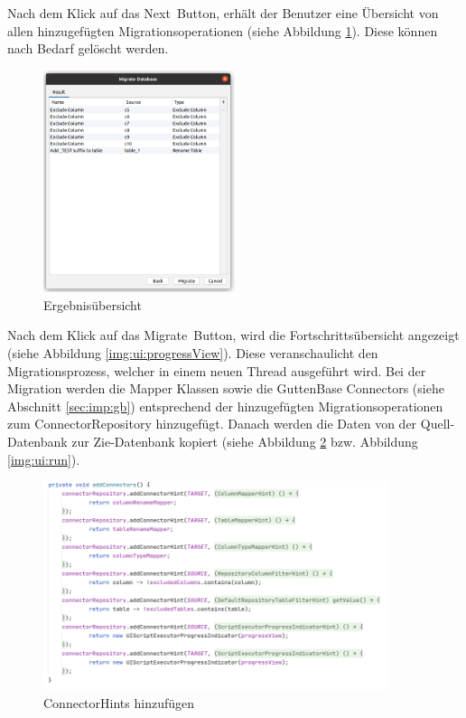 	Nach dem Klick auf das \glqq Next\grqq \, Button, erhält der Benutzer eine Übersicht von allen hinzugefügten Migrationsoperationen (siehe Abbildung \ref{img:ui:resultView}). Diese können nach Bedarf gelöscht werden.\\
	\begin{figure}[H]
		\centering
		\includegraphics[width=0.5\textwidth]{images/ui/resultView}
		\caption{Ergebnisübersicht}
		\label{img:ui:resultView}
	\end{figure}
	Nach dem Klick auf das \glqq Migrate\, Button, wird die Fortschrittsübersicht angezeigt (siehe Abbildung \ref{img:ui:progressView}). Diese veranschaulicht den Migrationsprozess, welcher in einem neuen Thread ausgeführt wird. Bei der Migration werden die Mapper Klassen sowie die GuttenBase Connectors (siehe Abschnitt \ref{sec:imp:gb}) entsprechend der hinzugefügten Migrationsoperationen zum ConnectorRepository hinzugefügt. Danach werden die Daten von der Quell-Datenbank zur Zie-Datenbank kopiert (siehe Abbildung \ref{img:ui:connectors} bzw. Abbildung \ref{img:ui:run}). \\
	\begin{figure}[H]
		\centering
		\includegraphics[width=0.9\textwidth]{images/ui/connectors}
		\caption{ConnectorHints hinzufügen}
		\label{img:ui:connectors}
	\end{figure}
